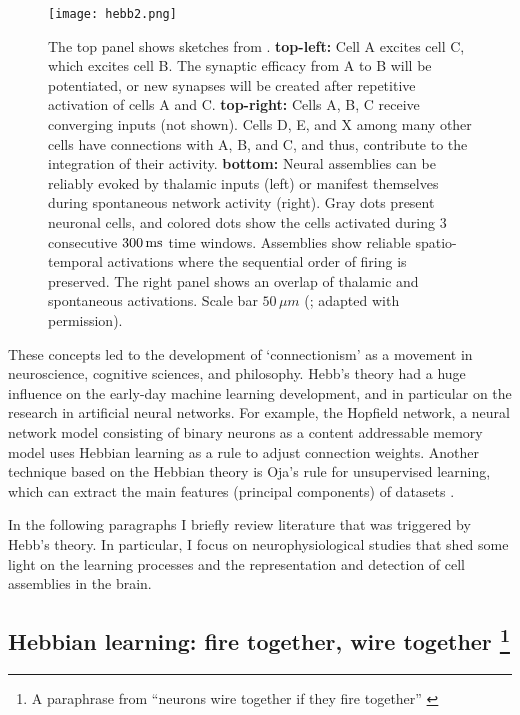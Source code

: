     \begin{figure}
      \center
      \texttt{[image: hebb2.png]}
      \caption{
        The top panel shows sketches from \citep{Hebb49}. {\bf top-left:} Cell
        A excites cell C, which excites cell B. The synaptic efficacy from A to
        B will be potentiated, or new synapses will be created after repetitive
        activation of cells A and C. {\bf top-right:} Cells A, B, C receive
        converging inputs (not shown). Cells D, E, and X among many other cells
        have connections with A, B, and C, and thus, contribute to the
        integration of their activity. {\bf bottom:} Neural assemblies can be
        reliably evoked by thalamic inputs (left) or manifest themselves during
        spontaneous network activity (right). Gray dots present neuronal cells,
        and colored dots show the cells activated during 3 consecutive
        $300\,\rm ms$ time windows. Assemblies show reliable spatio-temporal
        activations where the sequential order of firing is preserved. The
        right panel shows an overlap of thalamic and spontaneous activations.
        Scale bar $50\, \mu m$ (\citealp{Luczak2012}; adapted with permission).
             }
    \label{fig:hebb}
    \end{figure}

  These concepts led to the development of `connectionism' as a movement in
  neuroscience, cognitive sciences, and philosophy. Hebb's theory had a huge
  influence on the early-day machine learning development, and in particular on
  the research in artificial neural networks. For example, the Hopfield
  network, a neural network model consisting of binary neurons as a content
  addressable memory model \citep{Hopfield1982} uses Hebbian learning as a rule
  to adjust connection weights. Another technique based on the Hebbian theory
  is Oja's rule for unsupervised learning, which can extract the main features
  (principal components) of datasets \citep{Oja1982}.

  In the following paragraphs I briefly review literature that was triggered by
  Hebb's theory. In particular, I focus on neurophysiological studies that shed
  some light on the learning processes and the representation and detection of
  cell assemblies in the brain.
  
  \subsection{Hebbian learning: fire together, wire together {\protect\footnote{A
  paraphrase from ``neurons wire together if they fire together'' \citep{Lowel1992}}}}

